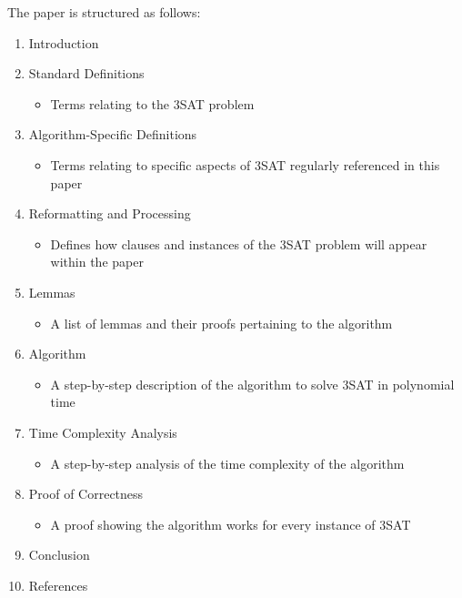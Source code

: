 \documentclass[manuscript]{acmart}
\begin{document}
        The paper is structured as follows:
        \begin{enumerate}
            \item Introduction
            \item Standard Definitions
            \begin{itemize}
                \item Terms relating to the 3SAT problem
            \end{itemize}
            \item Algorithm-Specific Definitions
            \begin{itemize}
                \item Terms relating to specific aspects of 3SAT regularly referenced in this paper
            \end{itemize}
            \item Reformatting and Processing
            \begin{itemize}
                \item Defines how clauses and instances of the 3SAT problem will appear within the paper
            \end{itemize}
            \item Lemmas
            \begin{itemize}
                \item A list of lemmas and their proofs pertaining to the algorithm
            \end{itemize}
            \item Algorithm
            \begin{itemize}
                \item A step-by-step description of the algorithm to solve 3SAT in polynomial time
            \end{itemize}
            \item Time Complexity Analysis
            \begin{itemize}
                \item A step-by-step analysis of the time complexity of the algorithm
            \end{itemize}
            \item Proof of Correctness
            \begin{itemize}
                \item A proof showing the algorithm works for every instance of 3SAT
            \end{itemize}
            \item Conclusion
            \item References
        \end{enumerate}
        
\end{document}
